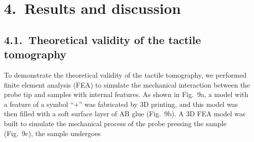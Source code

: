 \documentclass[11pt]{article}
\begin{document}
\section*{4.\ Results and discussion}

\subsection*{4.1.\ Theoretical validity of the tactile tomography}

To demonstrate the theoretical validity of the tactile tomography,
we performed finite element analysis (FEA) to simulate the
mechanical interaction between the probe tip and samples with
internal features. As shown in Fig.~9a, a model with a feature of a
symbol ``$+$'' was fabricated by 3D printing, and this model was
then filled with a soft surface layer of AB glue (Fig.~9b). A 3D
FEA model was built to simulate the mechanical process of the probe
pressing the sample (Fig.~9c), the sample undergoes
\end{document}
